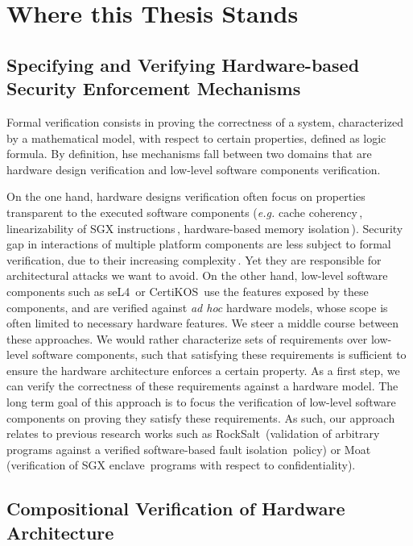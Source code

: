 \documentclass[oneside,a4paper]{memoir}
\theoremstyle{break}
\begin{document}


\section{Where this Thesis Stands}

\subsection{Specifying and Verifying Hardware-based Security Enforcement
  Mechanisms}

Formal verification consists in proving the correctness of a system,
characterized by a mathematical model, with respect to certain properties,
defined as logic formula.
%
By definition, \ac{hse} mechanisms fall between two domains that are hardware
design verification and low-level software components verification.

On the one hand, hardware designs verification often focus on properties
transparent to the executed software components (\emph{e.g.} cache
coherency\,\cite{stern1995cachecoherence}, linearizability of SGX
instructions\,\cite{leslie2015sgx}, hardware-based memory
isolation\,\cite{lie2003xom}).
%
Security gap in interactions of multiple platform components are less subject to
formal verification, due to their increasing
complexity\,\cite{potlapally2011hardwaresecurity}.
%
Yet they are responsible for architectural attacks we want to avoid.
%
On the other hand, low-level software components such as
seL4\,\cite{klein2009sel4} or CertiKOS\,\cite{gu2016certikos} use the features
exposed by these components, and are verified against \emph{ad hoc} hardware
models, whose scope is often limited to necessary hardware features.
%
We steer a middle course between these approaches.
%
We would rather characterize sets of requirements over low-level software
components, such that satisfying these requirements is sufficient to ensure the
hardware architecture enforces a certain property.
%
As a first step, we can verify the correctness of these requirements against a
hardware model.
%
The long term goal of this approach is to focus the verification of low-level
software components on proving they satisfy these requirements.
%
As such, our approach relates to previous research works such as
RockSalt\,\cite{morrisett2012rocksalt} (validation of arbitrary programs against
a verified software-based fault isolation\,\cite{wahbe1994sfi} policy) or
Moat\,\cite{sinha2015moat} (verification of SGX
enclave\,\cite{costan2016sgxexplained} programs with respect to
confidentiality).

\subsection{Compositional Verification of Hardware Architecture}

%

\end{document}
